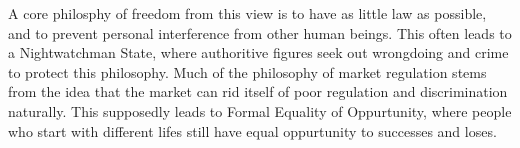 \documentclass{article}
\begin{document}
A core philosphy of freedom from this view is to have as little law as possible, and to prevent personal interference from other human beings. This often leads to a Nightwatchman State, where authoritive figures seek out wrongdoing and crime to protect this philosophy.
Much of the philosophy of market regulation stems from the idea that the market can rid itself of poor regulation and discrimination naturally. This supposedly leads to Formal Equality of Oppurtunity, where people who start with different lifes still have equal oppurtunity to successes and loses.
\end{document}
